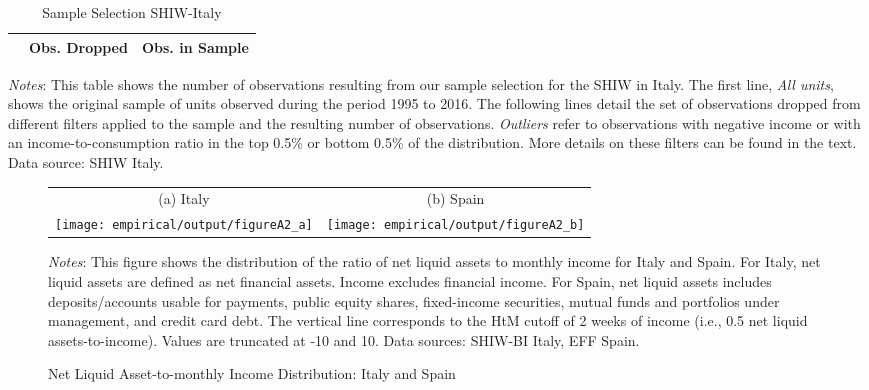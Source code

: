 \documentclass[12pt]{article}
\begin{document}
\begin{spacing}{1.5}
\begin{table}[H]
\begin{centering}
\captionsetup{justification=centering}
    \caption{Sample Selection SHIW-Italy \label{observations_italy}}
    \vspace*{-0.2em}
    \begin{tabular}{lcc}
    \midrule \midrule
     &Obs. Dropped & Obs. in Sample \\
    \toprule

       \midrule \midrule
    \end{tabular}
    \end{centering}
   \flushleft \footnotesize{\textit{Notes}: This table shows the number of observations resulting from our sample selection for the SHIW in Italy. The first line, \textit{All units}, shows the original sample of units observed during the period 1995 to 2016. The following lines detail the set of observations dropped from different filters applied to the sample and the resulting number of observations. \textit{Outliers} refer to observations  with negative income or with an income-to-consumption ratio in the top 0.5\% or bottom 0.5\% of the distribution.  More details on these filters can be found in the text. Data source: SHIW Italy.}
\end{table}


\begin{figure}[H]
\captionsetup{justification=centering}
\caption{Net Liquid Asset-to-monthly Income Distribution: Italy and Spain}
\begin{tabular}{cc}
(a) Italy & (b) Spain \\
\texttt{[image: empirical/output/figureA2\_a]} &
\texttt{[image: empirical/output/figureA2\_b]} \\
\end{tabular}
\flushleft\footnotesize{\textit{Notes}:
This figure shows the distribution of the ratio of net liquid assets to monthly income for Italy and Spain. For Italy, net liquid assets are defined as net financial assets.  Income excludes financial income. For Spain, net liquid assets includes deposits/accounts usable for payments, public equity shares, fixed-income securities, mutual funds and portfolios under management, and credit card debt. The vertical line corresponds to the HtM cutoff of 2 weeks of income (i.e., 0.5 net liquid assets-to-income). Values are truncated at -10 and 10. Data sources: SHIW-BI Italy, EFF Spain.} \label{fig:htm_it_spa}
\end{figure}



\end{spacing}
\end{document}
